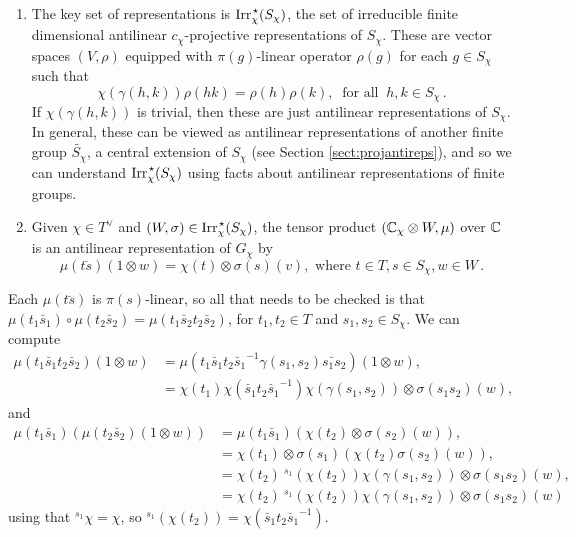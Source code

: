 \begin{enumerate}[resume, label=\textnormal{(\Roman*)}]  
\item The key set of representations is ${\operatorname{Irr}_{\chi}^{\hspace{0.1em} \star}(S_\chi)}$, the set of irreducible finite dimensional antilinear $c_{\chi}$-projective representations of $S_\chi$. These are vector spaces $(V,\rho)$ equipped with $\pi(g)$-linear operator $\rho(g)$ for each $g\in S_\chi$ such that
\begin{equation} \label{Cliff_2d}
\chi(\gamma (h,k)) \rho (hk) = \rho(h) \rho(k), \ \mbox{ for all } \ h,k \in S_\chi \, .
\end{equation}
If $\chi(\gamma (h,k))$ is trivial, then these are just antilinear representations of $S_\chi$. In general, these can be viewed as antilinear representations of another finite group $\widetilde{S_\chi}$, a central extension of $S_\chi$ (see Section \ref{sect:projantireps}), and so we can understand ${\operatorname{Irr}_{\chi}^{\hspace{0.1em} \star}(S_\chi)}$ using facts about antilinear representations of finite groups.
\item Given $\chi \in T^\vee$ and $(W,\sigma)\in {\operatorname{Irr}_{\chi}^{\hspace{0.1em} \star}(S_\chi)}$,
the tensor product $({\mathbb C}_\chi \otimes W,\mu)$ over ${\mathbb C}$ is an antilinear representation of $G_\chi$ by
\begin{equation} \label{Cliff_2e}
\mu (t \breve{s}) ( 1 \otimes w) = \chi(t) \otimes \sigma(s)(v), \mbox{ where } t\in T, s\in S_\chi, w\in W\, .
\end{equation}
\end{enumerate}

\begin{just}
Each $\mu(t \breve{s})$ is $\pi(s)$-linear, so all that needs to be checked is that $\mu(t_1 \breve{s_1}) \circ \mu(t_2 \breve{s_2}) = \mu(t_1 \breve{s_2} t_2 \breve{s_2})$, for $t_1,t_2 \in T$ and $s_1,s_2 \in S_{\chi}$. We can compute
\begin{align*}
\mu(t_1 \breve{s_1} t_2 \breve{s_2})(1 \otimes w) &= \mu(t_1 \breve{s_1} t_2 \breve{s_1}^{-1} \gamma(s_1,s_2) \breve{s_1s_2})(1 \otimes w), \\
&= \chi(t_1) \chi(\breve{s_1} t_2 \breve{s_1}^{-1}) \chi(\gamma(s_1,s_2)) \otimes \sigma(s_1s_2)(w),
\end{align*}
and 
\begin{align*}
\mu(t_1 \breve{s_1})(\mu(t_2 \breve{s_2})(1 \otimes w)) &= \mu(t_1 \breve{s_1})(\chi(t_2) \otimes \sigma(s_2)(w)), \\
&= \chi(t_1) \otimes \sigma(s_1)(\chi(t_2) \sigma(s_2)(w)), \\
&= \chi(t_2)\: {}^{s_1}(\chi(t_2)) \chi(\gamma(s_1,s_2)) \otimes \sigma(s_1 s_2)(w),\\
&= \chi(t_2)\: {}^{s_1}(\chi(t_2)) \chi(\gamma(s_1,s_2)) \otimes \sigma(s_1 s_2)(w)
\end{align*}
using that ${}^{s_1} \chi = \chi$, so ${}^{s_1}(\chi(t_2)) = \chi(\breve{s_1} t_2 \breve{s_1}^{-1})$.
\end{just}

